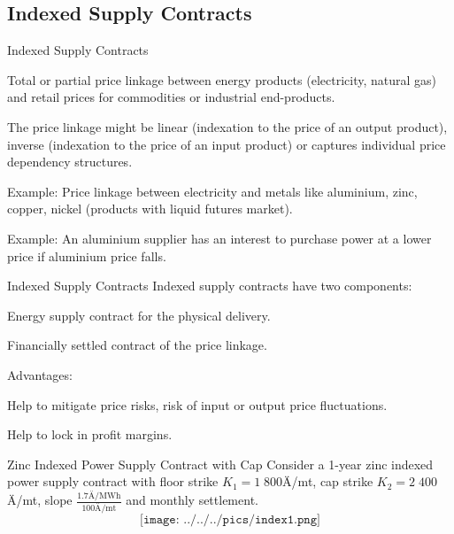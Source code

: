 \subsection{Indexed Supply Contracts}

{Indexed Supply Contracts}






	Total or partial price linkage between energy products (electricity, natural gas) and retail prices for commodities or industrial end-products.


	The price linkage might be linear (indexation to the price of an output product), inverse (indexation to the price of an input product) or captures individual price dependency structures.


	Example: Price linkage between electricity and metals like aluminium, zinc, copper, nickel (products with liquid futures market).


	Example: An aluminium supplier has an interest to purchase power at a lower price if aluminium price falls.





{Indexed Supply Contracts}
Indexed supply contracts have two components:






	Energy supply contract for the physical delivery.


	Financially settled contract of the price linkage.




\vspace{0.5cm}
Advantages:






	Help to mitigate price risks, risk of input or output price fluctuations.


	Help to lock in profit margins.





{Zinc Indexed Power Supply Contract with Cap}
Consider a 1-year zinc indexed power supply contract with floor strike $K_1=1\;800$Ä/mt, cap strike $K_2=2\;400$Ä/mt, slope $\frac{1.7\text{Ä/MWh}}{100\text{Ä/mt}}$ and monthly settlement.
$$\texttt{[image: ../../../pics/index1.png]}$$

